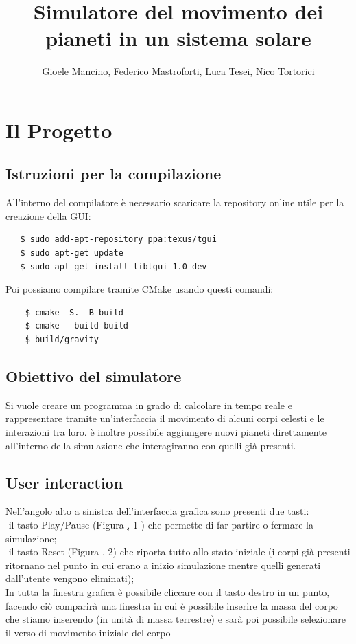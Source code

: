 \documentclass{article}
\title{Simulatore del movimento dei pianeti in un sistema solare}
\author{Gioele Mancino, Federico Mastroforti, Luca Tesei, Nico Tortorici}
\begin{document}
\maketitle
\section{Il Progetto}
\subsection{Istruzioni per la compilazione}
All'interno del compilatore è necessario scaricare la repository online utile per la creazione della GUI:
\begin{verbatim}
   $ sudo add-apt-repository ppa:texus/tgui
   $ sudo apt-get update
   $ sudo apt-get install libtgui-1.0-dev
    \end{verbatim}
Poi possiamo compilare tramite CMake usando questi comandi:
\begin{verbatim}
    $ cmake -S. -B build
    $ cmake --build build
    $ build/gravity
     \end{verbatim} 

\subsection{Obiettivo del simulatore}
Si vuole creare un programma in grado di calcolare in tempo reale e rappresentare tramite
un'interfaccia il movimento di alcuni corpi celesti e le interazioni tra loro. è inoltre possibile aggiungere nuovi pianeti direttamente all'interno della simulazione che interagiranno con quelli già presenti.

\subsection{User interaction}
Nell'angolo alto a sinistra dell'interfaccia grafica sono presenti due tasti: \\
-il tasto Play/Pause (Figura \href{playpause}, 1 ) che permette di far partire o fermare la simulazione;\\
-il tasto Reset (Figura \href{playpause}, 2) che riporta tutto allo stato iniziale (i corpi già presenti ritornano nel punto in cui erano a inizio simulazione mentre quelli generati dall'utente vengono eliminati); \\
In tutta la finestra grafica è possibile cliccare con il tasto destro in un punto, facendo ciò comparirà una finestra in cui è possibile inserire la massa del corpo che stiamo inserendo (in unità di massa terrestre) e sarà poi possibile selezionare il verso di movimento iniziale del corpo
\end{document}
